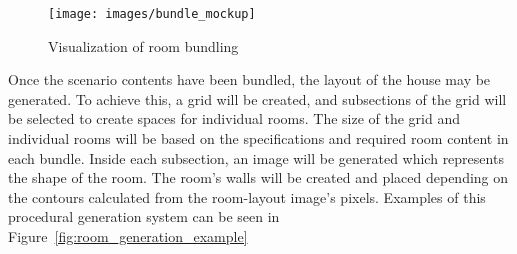 \documentclass{GlobalDocument}
\begin{document}
\begin{figure}[htb]
 \centering\texttt{[image: images/bundle\_mockup]}
  \caption{Visualization of room bundling}
  \label{fig:room_bundling}
\end{figure}


Once the scenario contents have been bundled, the layout of the house may be generated. To achieve this, a grid will be created, and subsections of the grid will be selected to create spaces for individual rooms. The size of the grid and individual rooms will be based on the specifications and required room content in each bundle. Inside each subsection, an image will be generated which represents the shape of the room. The room's walls will be created and placed depending on the contours calculated from the room-layout image's pixels. Examples of this procedural generation system can be seen in Figure~\ref{fig:room_generation_example}
\end{document}
